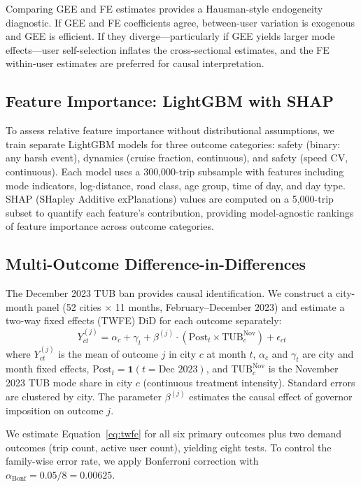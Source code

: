 Comparing GEE and FE estimates provides a Hausman-style endogeneity diagnostic. If GEE and FE coefficients agree, between-user variation is exogenous and GEE is efficient. If they diverge---particularly if GEE yields larger mode effects---user self-selection inflates the cross-sectional estimates, and the FE within-user estimates are preferred for causal interpretation.

\subsection{Feature Importance: LightGBM with SHAP}
\label{sec:meth_shap}

To assess relative feature importance without distributional assumptions, we train separate LightGBM models for three outcome categories: safety (binary: any harsh event), dynamics (cruise fraction, continuous), and safety (speed CV, continuous). Each model uses a 300,000-trip subsample with features including mode indicators, log-distance, road class, age group, time of day, and day type. SHAP (SHapley Additive exPlanations) values \citep{lundberg2017unified} are computed on a 5,000-trip subset to quantify each feature's contribution, providing model-agnostic rankings of feature importance across outcome categories.

\subsection{Multi-Outcome Difference-in-Differences}
\label{sec:meth_did}

The December 2023 TUB ban provides causal identification. We construct a city-month panel (52 cities $\times$ 11 months, February--December 2023) and estimate a two-way fixed effects (TWFE) DiD for each outcome separately:
\begin{equation}
    Y_{ct}^{(j)} = \alpha_c + \gamma_t + \beta^{(j)} \cdot (\text{Post}_t \times \text{TUB}^{\text{Nov}}_c) + \epsilon_{ct}
    \label{eq:twfe}
\end{equation}
where $Y_{ct}^{(j)}$ is the mean of outcome $j$ in city $c$ at month $t$, $\alpha_c$ and $\gamma_t$ are city and month fixed effects, $\text{Post}_t = \mathbf{1}(t = \text{Dec~2023})$, and $\text{TUB}^{\text{Nov}}_c$ is the November 2023 TUB mode share in city $c$ (continuous treatment intensity). Standard errors are clustered by city. The parameter $\beta^{(j)}$ estimates the causal effect of governor imposition on outcome $j$.

We estimate Equation~\ref{eq:twfe} for all six primary outcomes plus two demand outcomes (trip count, active user count), yielding eight tests. To control the family-wise error rate, we apply Bonferroni correction with $\alpha_{\text{Bonf}} = 0.05/8 = 0.00625$.

